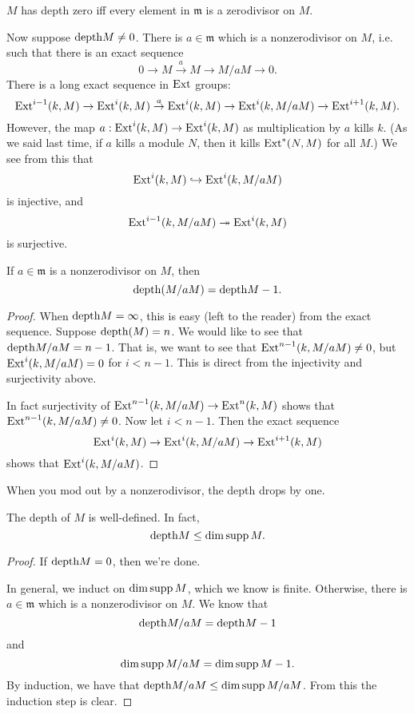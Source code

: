 \begin{proposition}
$M$ has depth zero iff every element in $\mathfrak{m}$ is a
zerodivisor on $M$.
\end{proposition}

Now suppose $\mathrm{depth} M \neq 0$. There is $a \in \mathfrak{m}$
which is a
nonzerodivisor on $M$, i.e.  such that there is
an exact sequence
\[ 0 \to M \stackrel{a}{\to} M \to M/aM \to 0.  \]
There is a long exact sequence in $\mathrm{Ext}$ groups:
\[\mathrm{Ext}^{i-1}(k,M) \to \mathrm{Ext}^i(k,M) \stackrel{a}{\to} \mathrm{Ext}^i(k,M)
\to \mathrm{Ext}^i(k,
M/aM) \to \mathrm{Ext}^{i+1}(k,M)  .\]
However, the map $a: \mathrm{Ext}^i(k,M) \to \mathrm{Ext}^i(k,M)$ as
multiplication by $a$
kills $k$. (As we said last time, if $a$ kills a module $N$,
then it kills
$\mathrm{Ext}^*(N,M)$ for all $M$.) We see from this that
\[ \mathrm{Ext}^i(k,M) \hookrightarrow \mathrm{Ext}^i(k,M/aM)  \]
is injective, and
\[ \mathrm{Ext}^{i-1}(k, M/aM) \twoheadrightarrow \mathrm{Ext}^i(k,M)  \]
is surjective.

\begin{corollary}
If $a \in \mathfrak{m}$ is a nonzerodivisor on $M$, then
\[ \mathrm{depth}(M/aM) = \mathrm{depth} M -1.  \]
\end{corollary}
\begin{proof}
When $\mathrm{depth} M = \infty$, this is easy (left to the reader) from
the exact
sequence. Suppose $\mathrm{depth}(M) = n$. We would like to see that
$\mathrm{depth} M/aM =
n-1$. That is, we want to see that $\mathrm{Ext}^{n-1}(k,M/aM) \neq 0$,
but
$\mathrm{Ext}^i(k,M/aM) =
0$ for $i < n-1$. This is direct from the injectivity and
surjectivity above.

In fact surjectivity of $\mathrm{Ext}^{n-1}(k,M/aM) \to \mathrm{Ext}^n(k,M)$
shows that
$\mathrm{Ext}^{n-1}(k,M/aM) \neq 0$. Now let $i < n-1$. Then the exact
sequence
\[ \mathrm{Ext}^i(k,M) \to \mathrm{Ext}^i(k,M/aM) \to \mathrm{Ext}^{i+1}(k,M)  \]
shows that $\mathrm{Ext}^i(k, M/aM)$.
\end{proof}

When you mod out by a nonzerodivisor, the depth drops by one.

\begin{corollary}
The depth of $M$ is well-defined. In fact,
\[ \mathrm{depth} M \leq \dim \operatorname{supp} M.  \]
\end{corollary}
\begin{proof}
If $\mathrm{depth} M = 0$, then we're done.

In general, we induct on $\dim \operatorname{supp} M$, which we know is
finite. Otherwise,
there is $ a \in \mathfrak{m}$ which is a nonzerodivisor on $M$.
We know that
\[ \mathrm{depth} M/aM = \mathrm{depth} M -1  \]
and
\[ \dim \operatorname{supp} M/aM = \dim \operatorname{supp} M -1.  \]
By induction, we have that $\mathrm{depth} M/aM \leq \dim \operatorname{supp} M/aM$.
From this the
induction step is clear.
\end{proof}

